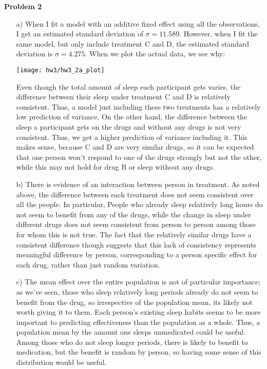 \documentclass[11pt]{article}
\theoremstyle{definition}
\begin{document}
{\bf Problem 2}
\begin{itemize}
    \item[a)]
        When I fit a model with an additive fixed effect using all the observations, I get an estimated standard deviation of $\sigma=11.589$. However, when I fit the same model, but only include treatment C and D, the estimated standard deviation is $\sigma=4.275$. When we plot the actual data, we see why:
        \begin{center}
            \texttt{[image: hw3/hw3\_2a\_plot]}
        \end{center}
        Even though the total amount of sleep each participant gets varies, the difference between their sleep under treatment C and D is relatively consistent. Thus, a model just including these two treatments has a relatively low prediction of variance. On the other hand, the difference between the sleep a participant gets on the drugs and without any drugs is not very consistent. Thus, we get a higher prediction of variance including it. This makes sense, because C and D are very similar drugs, so it can be expected that one person won't respond to one of the drugs strongly but not the other, while this may not hold for drug B or sleep without any drugs.

    \item[b)]
        There is evidence of an interaction between person in treatment. As noted above, the difference between each treatment does not seem consistent over all the people. In particular, People who already sleep relatively long hours do not seem to benefit from any of the drugs, while the change in sleep under different drugs does not seem consistent from person to person among those for whom this is not true. The fact that the relatively similar drugs have a consistent difference though suggests that this lack of consistency represents meaningful difference by person, corresponding to a person specific effect for each drug, rather than just random variation.
        
    \item[c)] The mean effect over the entire population is not of particular importance; as we've seen, those who sleep relatively long periods already do not seem to benefit from the drug, so irrespective of the population mean, its likely not worth giving it to them. Each person's existing sleep habits seems to be more important to predicting effectiveness than the population as a whole. Thus, a population mean by the amount one sleeps unmedicated could be useful. Among those who do not sleep longer periods, there is likely to benefit to medication, but the benefit is random by person, so having some sense of this distribution would be useful. 
 
\end{itemize}
\end{document}
